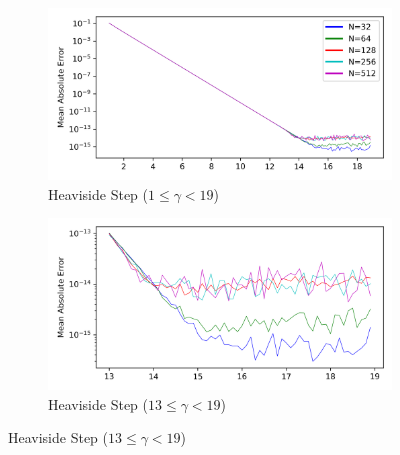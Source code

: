\documentclass[a4paper]{report}
\begin{document}
\begin{figure}[H]
    \begin{subfigure}{.45\linewidth}
      \includegraphics[width=\linewidth]{images/cavers/heaviside.png}
      \caption{Heaviside Step ($1 \leq \gamma < 19$)}
    \end{subfigure}\hfill
    \begin{subfigure}{.45\linewidth}
      \includegraphics[width=\linewidth]{images/cavers/heaviside_zoomed.png}
      \caption{Heaviside Step ($13 \leq \gamma < 19$)}
    \end{subfigure}
    
    \medskip
    

\end{figure}
\end{document}
